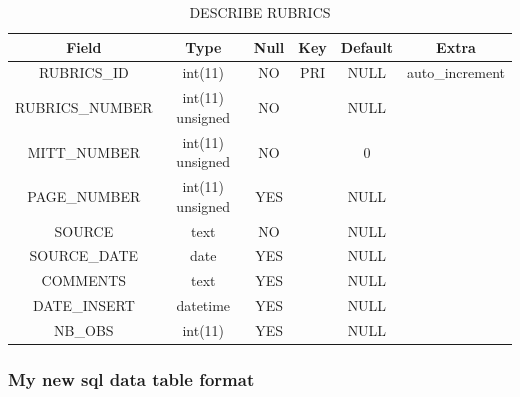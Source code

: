 \documentclass[12pt]{article}
\begin{document}
\begin{table}[h!]
    \centering
    \caption{DESCRIBE RUBRICS}
    \begin{tabular}{c|c|c|c|c|c}%
        \textbf{Field} & \textbf{Type} & \textbf{Null} & \textbf{Key} & \textbf{Default} & \textbf{Extra}  \\
        \hline
        RUBRICS\_ID & int(11) & NO & PRI & NULL & auto\_increment \\
        
        RUBRICS\_NUMBER & int(11) unsigned & NO && NULL & \\
        
        MITT\_NUMBER & int(11) unsigned & NO && 0 &  \\
        
        PAGE\_NUMBER & int(11) unsigned & YES && NULL &  \\
        
        SOURCE & text & NO && NULL &  \\
        
        SOURCE\_DATE & date & YES && NULL & \\
        
        COMMENTS & text & YES && NULL &  \\
        
        DATE\_INSERT & datetime & YES && NULL &  \\
        
        NB\_OBS & int(11) & YES && NULL & \\
        
    \end{tabular}
    \label{tab:data-og}
\end{table}

\newpage{}

\subsubsection{My new sql data table format}
\end{document}
